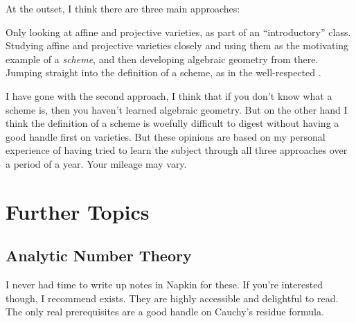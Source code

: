 At the outset, I think there are three main approaches:
\begin{itemize}
	\ii Only looking at affine and projective varieties,
	as part of an ``introductory'' class.
	\ii Studying affine and projective varieties closely
	and using them as the motivating example of a \emph{scheme},
	and then developing algebraic geometry from there.
	\ii Jumping straight into the definition of a scheme,
	as in the well-respected \cite{ref:vakil}.
\end{itemize}
I have gone with the second approach,
I think that if you don't know what a scheme is,
then you haven't learned algebraic geometry.
But on the other hand I think the definition of a scheme is woefully
difficult to digest without having a good handle first on varieties.
But these opinions are based on my personal experience of having
tried to learn the subject through all three approaches over a period of a year.
Your mileage may vary.

\section{Further Topics}
\subsection{Analytic Number Theory}
I never had time to write up notes in Napkin for these.
If you're interested though, I recommend \cite{ref:analytic_NT} exists.
They are highly accessible and delightful to read.
The only real prerequisites are a good handle on Cauchy's residue formula.
